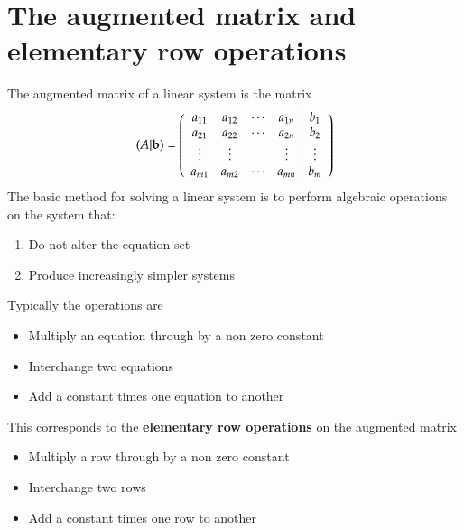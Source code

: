 \documentclass{article}[18pt]
\begin{document}
\section{The augmented matrix and elementary row operations}
The augmented matrix of a linear system is the matrix
$$( A | \mathbf { b } ) = \left( \begin{array} { c c c c | c } { a _ { 11 } } & { a _ { 12 } } & { \cdots } & { a _ { 1 n } } & { b _ { 1 } } \\ { a _ { 21 } } & { a _ { 22 } } & { \cdots } & { a _ { 2 n } } & { b _ { 2 } } \\ { \vdots } & { \vdots } & { } & { \vdots } & { \vdots } \\ { a _ { m 1 } } & { a _ { m 2 } } & { \cdots } & { a _ { m n } } & { b _ { m } } \end{array} \right)$$
The basic method for solving a linear system is to perform algebraic operations on the system that:
\begin{enumerate}[label=(\alph*)]
\item Do not alter the equation set
\item Produce increasingly simpler systems
\end{enumerate}
Typically the operations are
\begin{itemize}
\item Multiply an equation through by a non zero constant
\item Interchange two equations
\item Add a constant times one equation to another
\end{itemize}
This corresponds to the \textbf{elementary row operations} on the augmented matrix
\begin{itemize}
\item Multiply a row through by a non zero constant
\item Interchange two rows
\item Add a constant times one row to another
\end{itemize}
\end{document}
